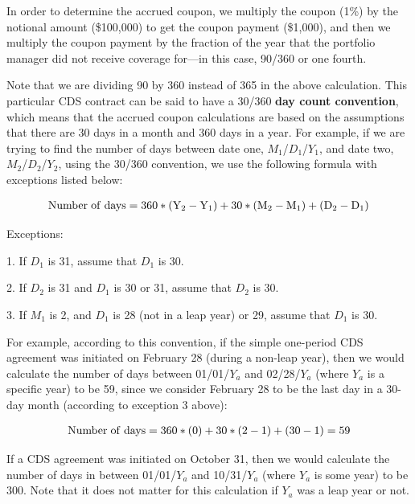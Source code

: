 \documentclass[article]{jss}
\begin{document}
In order to determine the accrued coupon, we multiply the coupon (1\%) by the notional amount (\$100,000) to get the coupon payment (\$1,000), and then we multiply the coupon payment by the fraction of the year that the portfolio manager did not receive coverage for---in this case, 90/360 or one fourth. 

Note that we are dividing 90 by 360 instead of 365 in the above calculation. This particular CDS contract can be said to have a 30/360 \textbf{day count convention}, which means that the accrued coupon calculations are based on the assumptions that there are 30 days in a month and 360 days in a year. For example, if we are trying to find the number of days between date one, $M_1$/$D_1$/$Y_1$, and date two, $M_2$/$D_2$/$Y_2$, using the 30/360 convention, we use the following formula with exceptions listed below:

\begin{equation}
 \begin{aligned}
  {\rm Number\hspace{3pt}of\hspace{3pt}days = 360 * (Y_{2} - Y_{1}) + 30 * (M_{2} - M_{1}) + (D_{2} - D_{1})}
    \end{aligned}
\end{equation}

Exceptions:

1. If $D_1$ is 31, assume that $D_1$ is 30.

2. If $D_2$ is 31 and $D_1$ is 30 or 31, assume that $D_2$ is 30.

3. If $M_1$ is 2, and $D_1$ is 28 (not in a leap year) or 29, assume that $D_1$ is 30.

For example, according to this convention, if the simple one-period CDS agreement was initiated on February 28 (during a non-leap year), then we would calculate the number of days between 01/01/$Y_a$ and 02/28/$Y_a$ (where $Y_a$ is a specific year) to be 59, since we consider February 28 to be the last day in a 30-day month (according to exception 3 above):

\begin{equation}
 \begin{aligned}
  {\rm Number\hspace{3pt}of\hspace{3pt}days = 360 * (0) + 30 * (2 - 1) + (30 - 1) = 59}
    \end{aligned}
\end{equation}

If a CDS agreement was initiated on October 31, then we would calculate the number of days in between 01/01/$Y_a$ and 10/31/$Y_a$ (where $Y_a$ is some year) to be 300. Note that it does not matter for this calculation if $Y_a$ was a leap year or not.
\end{document}
